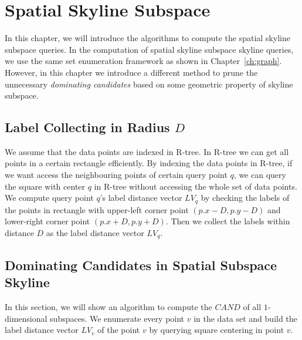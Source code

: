 
%
%

\chapter{Spatial Skyline Subspace}
\label{ch:spatial}

In this chapter, we will introduce the algorithms to compute the spatial skyline subspace queries. In the computation of spatial skyline subspace skyline queries, we use the same set enumeration framework as shown in Chapter~\ref{ch:graph}. However, in this chapter we introduce a different method to prune the unnecessary \emph{dominating candidates} based on some geometric property of skyline subspace.

\section{Label Collecting in Radius $D$}
We assume that the data points are indexed in R-tree. In R-tree we can get all points in a certain rectangle efficiently. By indexing the data points in R-tree, if we want access the neighbouring points of certain query point $q$, we can query the square with center $q$ in R-tree without accessing the whole set of data points. We compute query point $q$'s label distance vector $LV_q$ by checking the labels of the points in rectangle with upper-left corner point $(p.x - D, p.y - D)$ and lower-right corner point $(p.x + D, p.y + D)$. Then we collect the labels within distance $D$ as the label distance vector $LV_q$.

\section{Dominating Candidates in Spatial Subspace Skyline}

In this section, we will show an algorithm to compute the $\mathit{CAND}$ of all $1$-dimensional subspaces. We enumerate every point $v$ in the data set and build the label distance vector $LV_v$ of the point $v$ by querying square centering in point $v$.

